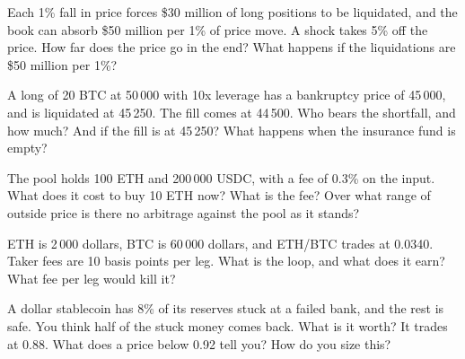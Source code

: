 \begin{question}\label{iq:iv2:crypto-for-traders-and-researchers:12}
Each 1\% fall in price forces \$30 million of long positions to be liquidated, and the book can absorb \$50 million per 1\% of price move. A shock takes 5\% off the price. How far does the price go in the end? What happens if the liquidations are \$50 million per 1\%?
\end{question}

\begin{question}\label{iq:iv2:crypto-for-traders-and-researchers:13}
A long of 20 BTC at 50\,000 with 10x leverage has a bankruptcy price of 45\,000, and is liquidated at 45\,250. The fill comes at 44\,500. Who bears the shortfall, and how much? And if the fill is at 45\,250? What happens when the insurance fund is empty?
\end{question}

\begin{question}\label{iq:iv2:crypto-for-traders-and-researchers:14}
The pool holds 100 ETH and 200\,000 USDC, with a fee of 0.3\% on the input. What does it cost to buy 10 ETH now? What is the fee? Over what range of outside price is there no arbitrage against the pool as it stands?
\end{question}

\begin{question}\label{iq:iv2:crypto-for-traders-and-researchers:15}
ETH is 2\,000 dollars, BTC is 60\,000 dollars, and ETH/BTC trades at 0.0340. Taker fees are 10 basis points per leg. What is the loop, and what does it earn? What fee per leg would kill it?
\end{question}

\begin{question}\label{iq:iv2:crypto-for-traders-and-researchers:16}
A dollar stablecoin has 8\% of its reserves stuck at a failed bank, and the rest is safe. You think half of the stuck money comes back. What is it worth? It trades at 0.88. What does a price below 0.92 tell you? How do you size this?
\end{question}

